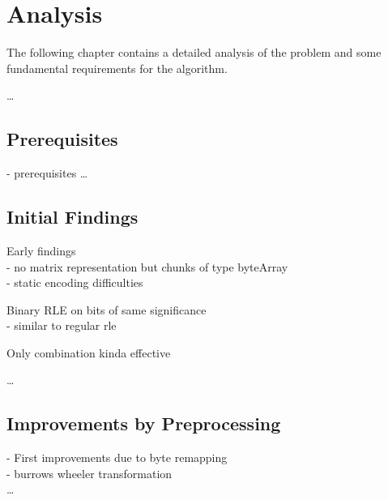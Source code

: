 
\chapter{Analysis}
\label{ch:Analysis}

\par{
The following chapter contains a detailed analysis of the problem and some fundamental requirements for the algorithm. 
}

\ldots

\section{Prerequisites}
\label{ch:Analysis:sec:Prerequisites}
- prerequisites
\ldots

\section{Initial Findings}
\label{ch:Analysis:sec:Initial Findings}

\par{
	Early findings\\
- no matrix representation but chunks of type byteArray\\
- static encoding difficulties\\
}

\par{
Binary RLE on bits of same significance\\
- similar to regular rle\\ 
}

\par{
Only combination kinda effective
}


\ldots

\section{Improvements by Preprocessing}
\label{ch:Analysis:sec:Improvements by Preprocessing}
- First improvements due to byte remapping\\
- burrows wheeler transformation\\
\ldots

